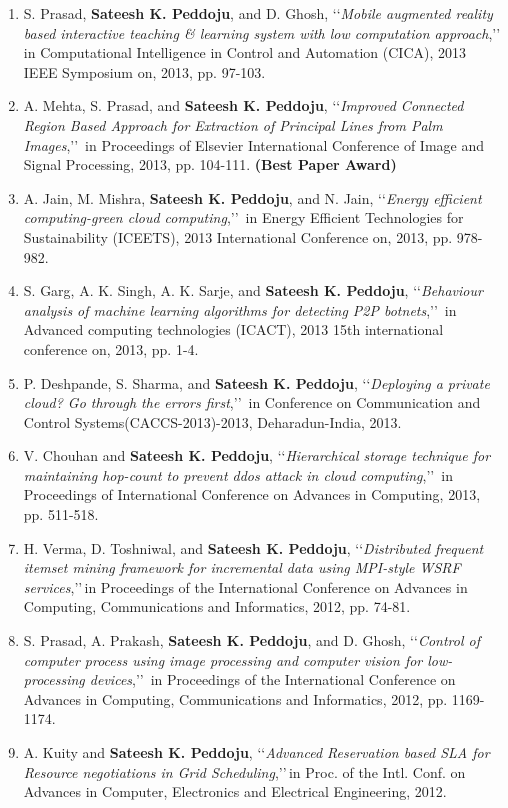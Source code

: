 \begin{enumerate}
	\item
	S. Prasad, \textbf{Sateesh K. Peddoju}, and D. Ghosh, \lq\lq \textit{Mobile augmented reality based interactive teaching \& learning system with low computation approach},\rq\rq\, in Computational Intelligence in Control and Automation (CICA), 2013 IEEE Symposium on, 2013, pp. 97-103.
	
	\item
	A. Mehta, S. Prasad, and  \textbf{Sateesh K. Peddoju}, \lq\lq \textit{Improved Connected Region Based Approach for Extraction of Principal Lines from Palm Images},\rq\rq\, in Proceedings of Elsevier International Conference of Image and Signal Processing, 2013, pp. 104-111. \textbf{(Best Paper Award)}
	
	\item
	A. Jain, M. Mishra, \textbf{Sateesh K. Peddoju}, and N. Jain, \lq\lq \textit{Energy efficient computing-green cloud computing},\rq\rq\, in Energy Efficient Technologies for Sustainability (ICEETS), 2013 International Conference on, 2013, pp. 978-982.
	
	\item
	S. Garg, A. K. Singh, A. K. Sarje, and \textbf{Sateesh K. Peddoju}, \lq\lq \textit{Behaviour analysis of machine learning algorithms for detecting P2P botnets},\rq\rq\, in Advanced computing technologies (ICACT), 2013 15th international conference on, 2013, pp. 1-4.
	
	\item
	P. Deshpande, S. Sharma, and \textbf{Sateesh K. Peddoju}, \lq\lq \textit{Deploying a private cloud? Go through the errors first},\rq\rq\, in Conference on Communication and Control Systems(CACCS-2013)-2013, Deharadun-India, 2013.
	
	
	\item
	V. Chouhan and \textbf{Sateesh K. Peddoju}, \lq\lq \textit{Hierarchical storage technique for maintaining hop-count to prevent ddos attack in cloud computing},\rq\rq\, in Proceedings of International Conference on Advances in Computing, 2013, pp. 511-518.
	
	\item
	H. Verma, D. Toshniwal, and  \textbf{Sateesh K. Peddoju}, \lq\lq \textit{Distributed frequent itemset mining framework for incremental data using MPI-style WSRF services},\rq\rq\,in Proceedings of the International Conference on Advances in Computing, Communications and Informatics, 2012, pp. 74-81.
	
	\item
	S. Prasad, A. Prakash, \textbf{Sateesh K. Peddoju}, and D. Ghosh, \lq\lq \textit{Control of computer process using image processing and computer vision for low-processing devices},\rq\rq\, in Proceedings of the International Conference on Advances in Computing, Communications and Informatics, 2012, pp. 1169-1174.
	
	\item
	A. Kuity and \textbf{Sateesh K. Peddoju}, \lq\lq \textit{Advanced Reservation based SLA for Resource negotiations in Grid Scheduling},\rq\rq\,in Proc. of the Intl. Conf. on Advances in Computer, Electronics and Electrical Engineering, 2012.
	
	\end{enumerate}